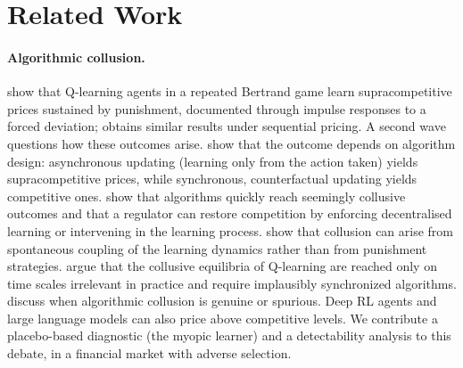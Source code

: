 \section{Related Work}
\label{sec:related}

\paragraph{Algorithmic collusion.} \citet{calvano2020} show that Q-learning
agents in a repeated Bertrand game learn supracompetitive prices sustained by
punishment, documented through impulse responses to a forced deviation;
\citet{klein2021} obtains similar results under sequential pricing. A second
wave questions how these outcomes arise. \citet{asker2022,asker2024} show that
the outcome depends on algorithm design: asynchronous updating (learning only
from the action taken) yields supracompetitive prices, while synchronous,
counterfactual updating yields competitive ones. \citet{abada2023} show that
algorithms quickly reach seemingly collusive outcomes and that a regulator can
restore competition by enforcing decentralised learning or intervening in the
learning process.
\citet{banchio2023} show that collusion can arise from spontaneous coupling
of the learning dynamics rather than from punishment strategies.
\citet{denboer2026} argue that the collusive equilibria of Q-learning are
reached only on time scales irrelevant in practice and require implausibly
synchronized algorithms. \citet{calvano2023} discuss when algorithmic
collusion is genuine or spurious. Deep RL agents \citep{deng2024} and large
language models \citep{fish2024} can also price above competitive levels.
We contribute a placebo-based diagnostic (the myopic learner) and a
detectability analysis to this debate, in a financial market with
adverse selection.

